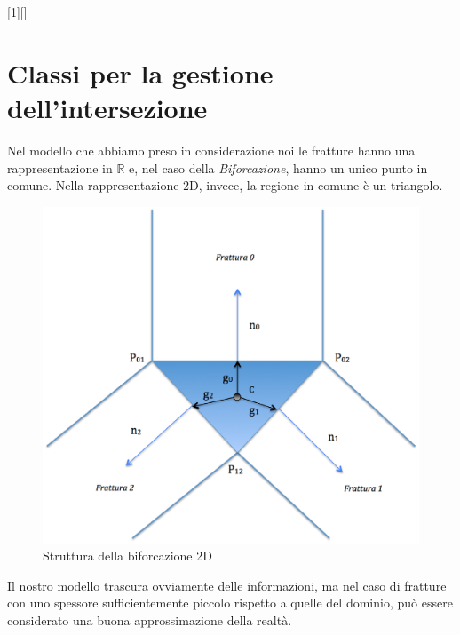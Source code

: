 [1][]{}{}

\chapter{Classi per la gestione dell'intersezione}

Nel modello che abbiamo preso in considerazione noi le fratture hanno una rappresentazione in $\mathbb{R}$ e, nel caso della \textit{Biforcazione}, hanno un unico punto in comune. 
Nella rappresentazione 2D, invece, la regione in comune è un triangolo. \\

\begin{figure}[htbp]
\centering
\includegraphics[scale=.5]{img/subcap3_3/TriangoloBiforcazione.eps}
\caption{Struttura della biforcazione 2D}\label{Biforcazione}
\end{figure}

Il nostro modello trascura ovviamente delle informazioni, ma nel caso di fratture con uno spessore sufficientemente piccolo rispetto a quelle del dominio, può essere considerato una buona approssimazione della realtà.\\

